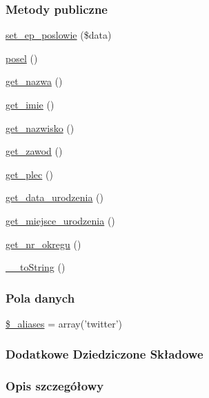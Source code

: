 \subsubsection*{Metody publiczne}
\begin{DoxyCompactItemize}
\item 
\hyperlink{classep___twitt_a6a354494d54778bcc9254b5826b5f28c}{set\-\_\-ep\-\_\-poslowie} (\$data)
\item 
\hyperlink{classep___twitt_ad3b9fc55831f7bcabb4870306bc08f4b}{posel} ()
\item 
\hyperlink{classep___twitt_ac0818f0049d7b84f08f77128f54cee36}{get\-\_\-nazwa} ()
\item 
\hyperlink{classep___twitt_ac4b0c85dc2a130038f2d118dbd0c3d77}{get\-\_\-imie} ()
\item 
\hyperlink{classep___twitt_abdd1d7ff92508da7f748ba1feec97af0}{get\-\_\-nazwisko} ()
\item 
\hyperlink{classep___twitt_af80ca8310b60004454dd02a387deaa2c}{get\-\_\-zawod} ()
\item 
\hyperlink{classep___twitt_ac7f9af5c3fa024e4c26a7b6bd4ce4bb4}{get\-\_\-plec} ()
\item 
\hyperlink{classep___twitt_a880b240cd2d8c336fd1709bf0cb1ae2c}{get\-\_\-data\-\_\-urodzenia} ()
\item 
\hyperlink{classep___twitt_ac57c08ec5e394a19c5bd9280c8376182}{get\-\_\-miejsce\-\_\-urodzenia} ()
\item 
\hyperlink{classep___twitt_a2645a9f0aa5b0ccc482943348c033d0a}{get\-\_\-nr\-\_\-okregu} ()
\item 
\hyperlink{classep___twitt_a7516ca30af0db3cdbf9a7739b48ce91d}{\-\_\-\-\_\-to\-String} ()
\end{DoxyCompactItemize}
\subsubsection*{Pola danych}
\begin{DoxyCompactItemize}
\item 
\hyperlink{classep___twitt_ab4e31d75f0bc5d512456911e5d01366b}{\$\-\_\-aliases} = array('twitter')
\end{DoxyCompactItemize}
\subsubsection*{Dodatkowe Dziedziczone Składowe}


\subsubsection{Opis szczegółowy}


